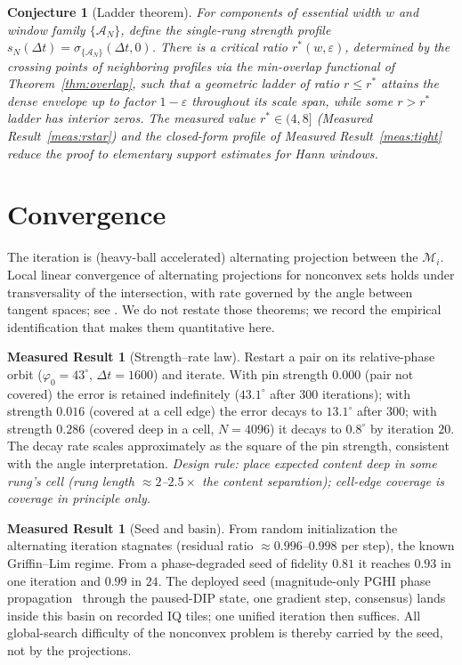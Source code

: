 \documentclass[11pt]{article}
\newtheorem{conjecture}[theorem]{Conjecture}
\theoremstyle{definition}
\newtheorem{measured}[theorem]{Measured Result}
\newcommand{\cA}{\mathcal{A}}
\newcommand{\cM}{\mathcal{M}}
\begin{document}
\begin{conjecture}[Ladder theorem]\label{conj:ladder}
For components of essential width $w$ and window family
$\{\cA_{N}\}$, define the single-rung strength profile
$s_{N}(\Delta t)=\sigma_{\{\cA_N\}}(\Delta t,0)$.  There is a critical
ratio $r^{*}(w,\varepsilon)$, determined by the crossing points of
neighboring profiles via the min-overlap functional of
Theorem~\ref{thm:overlap}, such that a geometric ladder of ratio
$r\le r^{*}$ attains the dense envelope up to factor $1-\varepsilon$
throughout its scale span, while some $r>r^{*}$ ladder has interior zeros.
The measured value $r^{*}\in(4,8]$ (Measured Result~\ref{meas:rstar}) and
the closed-form profile of Measured Result~\ref{meas:tight} reduce the
proof to elementary support estimates for Hann windows.
\end{conjecture}

\section{Convergence}\label{sec:convergence}

The iteration is (heavy-ball accelerated) alternating projection between
the $\cM_i$.  Local linear convergence of alternating projections for
nonconvex sets holds under transversality of the intersection, with rate
governed by the angle between tangent spaces; see
\cite{lewisluke2009,drusvyatskiy2015}.  We do not restate those theorems;
we record the empirical identification that makes them quantitative here.

\begin{measured}[Strength--rate law]\label{meas:rate}
Restart a pair on its relative-phase orbit ($\varphi_{0}=43^{\circ}$,
$\Delta t=1600$) and iterate.  With pin strength $0.000$ (pair not covered)
the error is retained indefinitely ($43.1^{\circ}$ after $300$ iterations);
with strength $0.016$ (covered at a cell edge) the error decays to
$13.1^{\circ}$ after $300$; with strength $0.286$ (covered deep in a cell,
$N=4096$) it decays to $0.8^{\circ}$ by iteration $20$.  The decay rate
scales approximately as the square of the pin strength, consistent with the
angle interpretation.  \emph{Design rule: place expected content deep in
some rung's cell (rung length ${\approx}2$--$2.5\times$ the content
separation); cell-edge coverage is coverage in principle only.}
\end{measured}

\begin{measured}[Seed and basin]\label{meas:seed}
From random initialization the alternating iteration stagnates (residual
ratio ${\approx}0.996$--$0.998$ per step), the known Griffin--Lim regime.
From a phase-degraded seed of fidelity $0.81$ it reaches $0.93$ in one
iteration and $0.99$ in $24$.  The deployed seed (magnitude-only PGHI
phase propagation~\cite{prusa2017} through the paused-DIP state, one
gradient step, consensus) lands inside this basin on recorded IQ tiles;
one unified iteration then suffices.  All global-search difficulty of the
nonconvex problem is thereby carried by the seed, not by the projections.
\end{measured}
\end{document}

